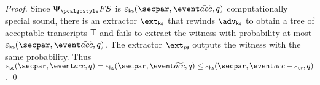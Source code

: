 \begin{proof}
	Since $\psfs$ is $\epscss (\secpar, \waccProb,q)$ computationally special sound, there is an extractor $\extcss$ that rewinds $\advcss$ to obtain a tree of acceptable transcripts $\mathsf{T}$ and fails to extract the witness with probability at most $\epscss (\secpar, \waccProb, q)$. The extractor $\extse$ outputs the witness with the same probability.
%
	Thus $\epsse(\secpar,\accProb,q) = \epscss (\secpar, \waccProb,q) \leq \epscss(\secpar,\accProb - \epsur,q)$.
	\qed
	\end{proof}


